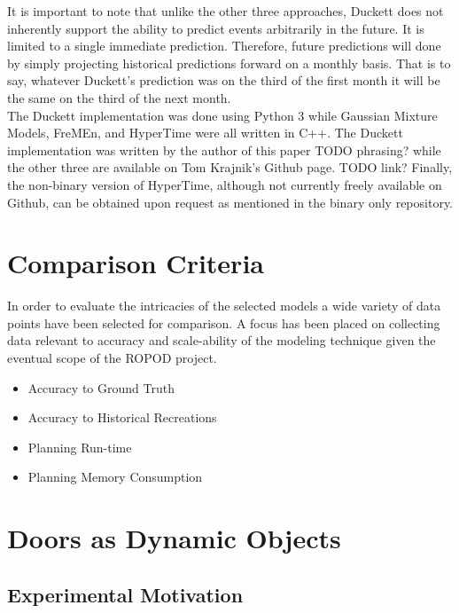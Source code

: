   It is important to note that unlike the other three approaches, Duckett does
  not inherently support the ability to predict events arbitrarily in the future.
  It is limited to a single immediate prediction. Therefore, future predictions
  will done by simply projecting historical predictions forward on a monthly basis.
  That is to say, whatever Duckett's prediction was on the third of the first month
  it will be the same on the third of the next month. \\

  The Duckett implementation was done using Python 3 while Gaussian Mixture
  Models, FreMEn, and HyperTime were all written in C++. The Duckett implementation
  was written by the author of this paper TODO phrasing? while the other three
  are available on Tom Krajnik's Github page. TODO link? Finally, the non-binary
  version of HyperTime, although not currently freely available on Github, can
  be obtained upon request as mentioned in the binary only repository.




  \section{ Comparison Criteria }
  In order to evaluate the intricacies of the selected models a wide variety
  of data points have been selected for comparison. A focus has been placed on
  collecting data relevant to accuracy and scale-ability of the modeling
  technique given the eventual scope of the ROPOD project.

  \begin{itemize}

    \item Accuracy to Ground Truth

    \item Accuracy to Historical Recreations

    \item Planning Run-time

    \item Planning Memory Consumption

  \end{itemize}

  \section{ Doors as Dynamic Objects }

  \subsection{ Experimental Motivation }

